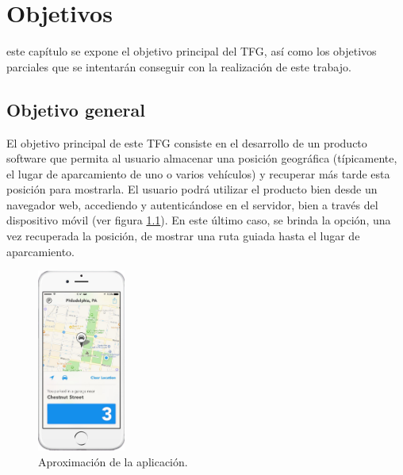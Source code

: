 \chapter{Objetivos}
\label{chap:objetivos}

\noindent
%

 este capítulo se expone el objetivo principal del \ac{TFG}, así como los objetivos parciales que se intentarán conseguir con la realización de este trabajo.

\section{Objetivo general}
El objetivo principal de este \ac{TFG} consiste en el desarrollo de un producto software que permita al usuario almacenar una posición geográfica (típicamente, el lugar de aparcamiento de uno o varios vehículos) y recuperar más tarde esta posición para mostrarla. El usuario podrá utilizar el producto bien desde un navegador web, accediendo y autenticándose en el servidor, bien a través del dispositivo móvil (ver figura \ref{fig:Preview_App}). En este último caso, se brinda la opción, una vez recuperada la posición, de mostrar una ruta guiada hasta el lugar de aparcamiento.

\begin{figure}[h!btp]
\centering
\includegraphics[height=60mm, fbox={\fboxrule} 4mm]{images/02-objetivos/01-telefono_parking.jpg}
\caption{Aproximación de la aplicación.}
\label{fig:Preview_App}
\end{figure}

